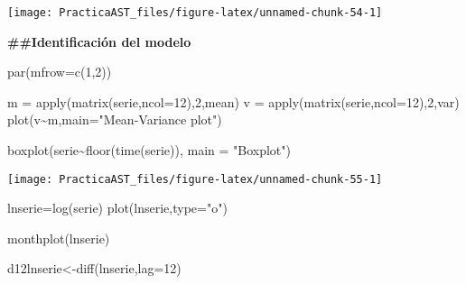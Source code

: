 \documentclass[
]{article}
\newenvironment{Shaded}{\begin{snugshade}}{\end{snugshade}}
\newcommand{\AttributeTok}[1]{\textcolor[rgb]{0.77,0.63,0.00}{#1}}
\newcommand{\DecValTok}[1]{\textcolor[rgb]{0.00,0.00,0.81}{#1}}
\newcommand{\FunctionTok}[1]{\textcolor[rgb]{0.00,0.00,0.00}{#1}}
\newcommand{\NormalTok}[1]{#1}
\newcommand{\OtherTok}[1]{\textcolor[rgb]{0.56,0.35,0.01}{#1}}
\newcommand{\SpecialCharTok}[1]{\textcolor[rgb]{0.00,0.00,0.00}{#1}}
\newcommand{\StringTok}[1]{\textcolor[rgb]{0.31,0.60,0.02}{#1}}
\begin{document}
\begin{center}\texttt{[image: PracticaAST\_files/figure-latex/unnamed-chunk-54-1]} \end{center}

\textbf{\#\#Identificación del modelo}

\begin{Shaded}
\begin{Highlighting}[]
\FunctionTok{par}\NormalTok{(}\AttributeTok{mfrow=}\FunctionTok{c}\NormalTok{(}\DecValTok{1}\NormalTok{,}\DecValTok{2}\NormalTok{))}

\NormalTok{m }\OtherTok{=} \FunctionTok{apply}\NormalTok{(}\FunctionTok{matrix}\NormalTok{(serie,}\AttributeTok{ncol=}\DecValTok{12}\NormalTok{),}\DecValTok{2}\NormalTok{,mean)}
\NormalTok{v }\OtherTok{=} \FunctionTok{apply}\NormalTok{(}\FunctionTok{matrix}\NormalTok{(serie,}\AttributeTok{ncol=}\DecValTok{12}\NormalTok{),}\DecValTok{2}\NormalTok{,var)}
\FunctionTok{plot}\NormalTok{(v}\SpecialCharTok{\textasciitilde{}}\NormalTok{m,}\AttributeTok{main=}\StringTok{"Mean{-}Variance plot"}\NormalTok{)}

\FunctionTok{boxplot}\NormalTok{(serie}\SpecialCharTok{\textasciitilde{}}\FunctionTok{floor}\NormalTok{(}\FunctionTok{time}\NormalTok{(serie)), }\AttributeTok{main =} \StringTok{"Boxplot"}\NormalTok{)}
\end{Highlighting}
\end{Shaded}

\begin{center}\texttt{[image: PracticaAST\_files/figure-latex/unnamed-chunk-55-1]} \end{center}

\begin{Shaded}
\begin{Highlighting}[]
\NormalTok{lnserie}\OtherTok{=}\FunctionTok{log}\NormalTok{(serie)}
\FunctionTok{plot}\NormalTok{(lnserie,}\AttributeTok{type=}\StringTok{"o"}\NormalTok{)}
\end{Highlighting}
\end{Shaded}

\begin{Shaded}
\begin{Highlighting}[]
\FunctionTok{monthplot}\NormalTok{(lnserie)}
\end{Highlighting}
\end{Shaded}

\begin{Shaded}
\begin{Highlighting}[]
\NormalTok{d12lnserie}\OtherTok{\textless{}{-}}\FunctionTok{diff}\NormalTok{(lnserie,}\AttributeTok{lag=}\DecValTok{12}\NormalTok{)}
\end{Highlighting}
\end{Shaded}
\end{document}
